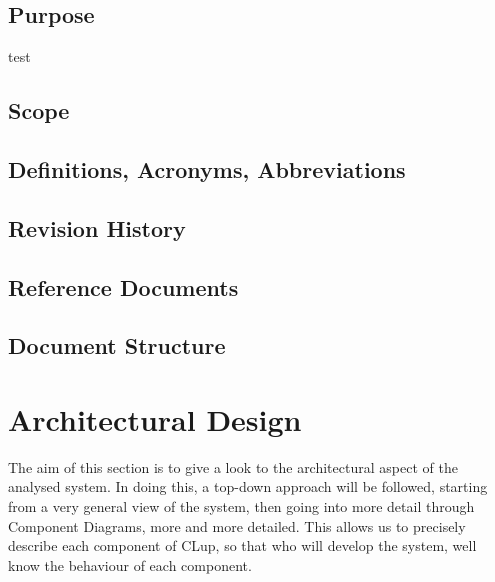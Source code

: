 \documentclass{article}
\begin{document}
	\subsection{Purpose}
	test
	\subsection{Scope}
	\subsection{Definitions, Acronyms, Abbreviations}
	\subsection{Revision History}
	\subsection{Reference Documents}
	\subsection{Document Structure}

\section{Architectural Design}
	The aim of this section is to give a look to the architectural aspect of the analysed system. In doing this, a top-down approach will be followed, starting from a very general view of the system, then going into more detail through Component Diagrams, more and more detailed. This allows us to precisely describe each component of CLup, so that who will develop the system, well know the behaviour of each component.
	
	
\end{document}
